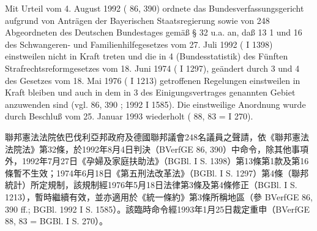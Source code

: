 \documentclass[12pt]{article}
\begin{document}
\begin{sourcepara}[title={原文理由 A.III}]
Mit Urteil vom 4. August 1992 (\abbrBVerfGE{} 86, 390) ordnete das Bundesverfassungsgericht aufgrund von Anträgen der Bayerischen Staatsregierung sowie von 248 Abgeordneten des Deutschen Bundestages gemäß § 32 \abbrBVerfGG{} u.a. an, daß \abbrArt{} 13 \abbrNr{} 1 und \abbrArt{} 16 des Schwangeren- und Familienhilfegesetzes vom 27. Juli 1992 (\abbrBGBl{} I \abbrS{} 1398) einstweilen nicht in Kraft treten und die in \abbrArt{} 4 (Bundesstatistik) des Fünften Strafrechtsreformgesetzes vom 18. Juni 1974 (\abbrBGBl{} I \abbrS{} 1297), geändert durch \abbrArt{} 3 und \abbrArt{} 4 des Gesetzes vom 18. Mai 1976 (\abbrBGBl{} I \abbrS{} 1213) getroffenen Regelungen einstweilen in Kraft bleiben und auch in dem in \abbrArt{} 3 des Einigungsvertrages genannten Gebiet anzuwenden sind (vgl. \abbrBVerfGE{} 86, 390 \abbrFF{}; \abbrBGBl{} 1992 I \abbrS{} 1585). Die einstweilige Anordnung wurde durch Beschluß vom 25. Januar 1993 wiederholt (\abbrBVerfGE{} 88, 83 = \abbrBGBl{} I \abbrS{} 270).
\end{sourcepara}
\begin{transpara}
聯邦憲法法院依巴伐利亞邦政府及德國聯邦議會248名議員之聲請，依《聯邦憲法法院法》第32條，於1992年8月4日判決（BVerfGE 86, 390）中命令，除其他事項外，1992年7月27日《孕婦及家庭扶助法》（BGBl. I S. 1398）第13條第1款及第16條暫不生效；1974年6月18日《第五刑法改革法》（BGBl. I S. 1297）第4條（聯邦統計）所定規制，該規制經1976年5月18日法律第3條及第4條修正（BGBl. I S. 1213），暫時繼續有效，並亦適用於《統一條約》第3條所稱地區（參 BVerfGE 86, 390 ff.; BGBl. 1992 I S. 1585）。該臨時命令經1993年1月25日裁定重申（BVerfGE 88, 83 = BGBl. I S. 270）。
\end{transpara}


\end{document}
